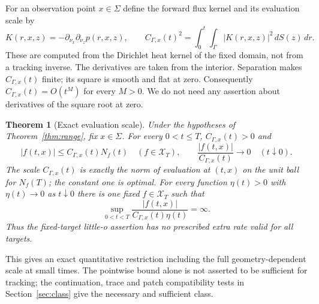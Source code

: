 \documentclass[11pt]{article}
\newtheorem{theorem}{Theorem}[section]
\theoremstyle{remark}
\newcommand{\calX}{\mathcal X}
\begin{document}
For an observation point $x\in\Sigma$ define the forward flux kernel and
its evaluation scale by
\begin{equation}\label{eq:KC}
 K(r,x,z)=-\partial_{\nu_x}\partial_{\nu_z}p(r,x,z),\qquad
 C_{\Gamma,x}(t)^2=\int_0^t\int_\Gamma|K(r,x,z)|^2\,dS(z)\,dr .
\end{equation}
These are computed from the Dirichlet heat kernel of the fixed domain,
not from a tracking inverse. The derivatives are taken from the interior.
Separation makes $C_{\Gamma,x}(t)$ finite; its square is smooth and
flat at zero. Consequently $C_{\Gamma,x}(t)=O(t^M)$ for every $M>0$.
We do not need any assertion about derivatives of the square root at zero.

\begin{theorem}[Exact evaluation scale]\label{thm:sharp}
Under the hypotheses of Theorem~\ref{thm:range}, fix $x\in\Sigma$.
For every $0<t\leq T$, $C_{\Gamma,x}(t)>0$ and
\begin{equation}\label{eq:sharpbound}
 |f(t,x)|\leq C_{\Gamma,x}(t)N_f(t)
                  \quad(f\in\calX_T),\qquad
 \frac{|f(t,x)|}{C_{\Gamma,x}(t)}\longrightarrow0
                         \quad(t\downarrow0).
\end{equation}
The scale $C_{\Gamma,x}(t)$ is exactly the norm of evaluation at $(t,x)$
on the unit ball for $N_f(T)$; the constant one is optimal.
For every function $\eta(t)>0$ with $\eta(t)\to0$ as $t\downarrow0$
there is one fixed $f\in\calX_T$ such that
\begin{equation}\label{eq:norate}
 \sup_{0<t<T}\frac{|f(t,x)|}{C_{\Gamma,x}(t)\eta(t)}=\infty .
\end{equation}
Thus the fixed-target little-o assertion has no prescribed extra rate
valid for all targets.
\end{theorem}

This gives an exact quantitative restriction including the full
geometry-dependent scale at small times.
The pointwise bound alone is not asserted to be sufficient for tracking;
the continuation, trace and patch compatibility tests in
Section~\ref{sec:class} give the necessary and sufficient class.
\end{document}
